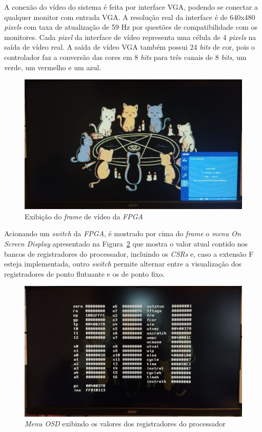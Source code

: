     { A conexão do vídeo do sistema é feita por interface VGA, podendo se
        conectar a qualquer monitor com entrada VGA. A resolução real da
        interface é de 640x480 \textit{pixels} com taxa de atualização de 59 Hz
        por questões de compatibilidade com os monitores. Cada \textit{pixel}
        da interface de vídeo representa uma célula de 4 \textit{pixels} na
        saída de vídeo real. A saída de vídeo VGA também possui 24 \textit{bits}
        de cor, pois o controlador faz a conversão das cores em 8 \textit{bits}
        para três canais de 8 \textit{bits}, um verde, um vermelho e um azul.
    }
    \begin{figure}[H]
    \centering
        \includegraphics[width=.9\linewidth]{../images/osd/display.jpg}
        \caption{Exibição do \textit{frame} de vídeo da \textit{FPGA}}
        \label{fig:display_cats}
    \end{figure}

    { Acionando um \textit{switch} da \textit{FPGA}, é mostrado por cima do
        \textit{frame} o \textit{menu On Screen Display} apresentado na
        Figura~\ref{fig:display_cats_osd} que mostra o valor
        atual contido nos bancos de registradores do processador, incluindo os
        \textit{CSRs} e, caso a extensão F esteja implementada, outro
        \textit{switch} permite alternar entre a visualização dos registradores
        de ponto flutuante e os de ponto fixo.
    }
    \begin{figure}[H]
    \centering
        \includegraphics[width=.9\linewidth]{../images/osd/display_osd.jpg}
        \caption{\textit{Menu OSD} exibindo os valores dos registradores do processador}
        \label{fig:display_cats_osd}
    \end{figure}

